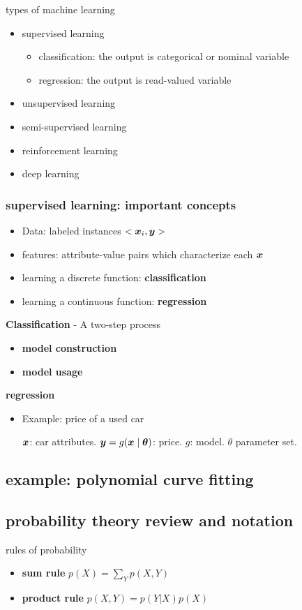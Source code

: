 \documentclass[11pt]{article}
\begin{document}
types of machine learning
\begin{itemize}
\item supervised learning
\begin{itemize}
\item classification: the output is categorical or nominal variable
\item regression: the output is read-valued variable
\end{itemize}
\item unsupervised learning
\item semi-supervised learning
\item reinforcement learning
\item deep learning
\end{itemize}
\subsubsection{supervised learning: important concepts}
\label{sec:orgd92c816}
\begin{itemize}
\item Data: labeled instances \(<\boldsymbol{x}_i,\boldsymbol{y}>\)
\item features: attribute-value pairs which characterize each \(\boldsymbol{x}\)
\item learning a discrete function: \textbf{classification}
\item learning a continuous function: \textbf{regression}
\end{itemize}

\textbf{Classification} - A two-step process
\begin{itemize}
\item \textbf{model construction}
\item \textbf{model usage}
\end{itemize}

\textbf{regression}
\begin{itemize}
\item Example: price of a used car

\(\boldsymbol{x}\): car attributes. \(\boldsymbol{y}=g(\boldsymbol{x}\mid\boldsymbol{\theta})\): price. \(g\):
model. \(\theta\) parameter set.
\end{itemize}
\subsection{example: polynomial curve fitting}
\label{sec:org86cf89e}
\subsection{probability theory review and notation}
\label{sec:org742f022}
rules of probability
\begin{itemize}
\item \textbf{sum rule} \(p(X)=\displaystyle\sum_Yp(X,Y)\)
\item \textbf{product rule} \(p(X,Y)=p(Y|X)p(X)\)
\end{itemize}
\end{document}
